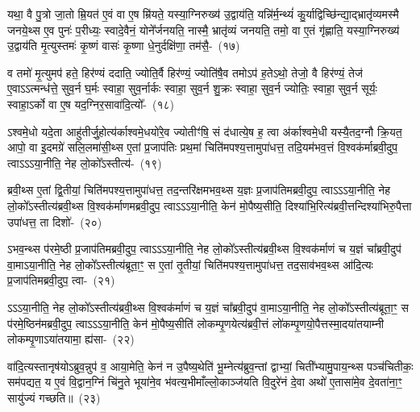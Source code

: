 {\anuvakamend[{भा॒ग॒धेय॒ञ्जुह्व॑ति पर॒मा रा॒ष्ट्रं द॑धाति स॒प्त च॑}]}

यथा॒ वै पु॒त्रो जा॒तो म्रि॒यत॑ ए॒वं वा ए॒ष म्रि॑यते॒ यस्या॒ग्निरुख्य॑ उ॒द्वाय॑ति॒ यन्नि॑र्म॒न्थ्यं॑ कु॒र्याद्विच्छि॑न्द्या॒द्भ्रातृ॑व्यमस्मै जनये॒थ्स ए॒व पुनः॑ प॒रीध्यः॒ स्वादे॒वैनं॒ योने᳚र्जनयति॒ नास्मै॒ भ्रातृ॑व्यं जनयति॒ तमो॒ वा ए॒तं गृ॑ह्णाति॒ यस्या॒ग्निरुख्य॑ उ॒द्वाय॑ति मृ॒त्युस्तमः॑ कृ॒ष्णं वासः॑ कृ॒ष्णा धे॒नुर्दक्षि॑णा॒ तम॑सै॒-~(१७)\ip

व तमो॑ मृ॒त्युमप॑ हते॒ हिर॑ण्यं ददाति॒ ज्योति॒र्वै हिर॑ण्यं॒ ज्योति॑षै॒व तमो\-ऽप॑ ह॒ते\-ऽथो॒ तेजो॒ वै हिर॑ण्यं॒ तेज॑ ए॒वा\-ऽऽ\-त्मन्ध॑त्ते॒ सुव॒र्न घ॒र्मः स्वाहा॒ सुव॒र्नार्कः स्वाहा॒ सुव॒र्न शु॒क्रः स्वाहा॒ सुव॒र्न ज्योतिः॒ स्वाहा॒ सुव॒र्न सूर्यः॒ स्वाहा॒\-ऽर्को वा ए॒ष यद॒ग्निर॒सावा॑दि॒त्यो᳚-~(१८)\ip

ऽश्वमे॒धो यदे॒ता आहु॑तीर्जु॒होत्य॑र्काश्वमे॒धयो॑रे॒व ज्योतीꣳ॑षि॒ सं द॑धात्ये॒ष ह॒ त्वा अ॑र्का\-श्वमे॒धी यस्यै॒तद॒ग्नौ क्रि॒यत॒ आपो॒ वा इ॒दमग्रे॑ सलि॒लमा॑सी॒थ्स ए॒तां प्र॒जा\-प॑तिः प्रथ॒मां चिति॑\-मपश्य॒त्तामुपा॑धत्त॒ तदि॒यम॑भव॒त्तं वि॒श्वक॑र्माब्रवी॒दुप॒ त्वा\-ऽऽ\-ऽया॒नीति॒ नेह लो॒को᳚\-ऽस्तीत्य॑-~(१९)\ip

ब्रवी॒थ्स ए॒तां द्वि॒तीयां॒ चिति॑मपश्य॒त्तामुपा॑धत्त॒ तद॒न्तरि॑क्षमभव॒थ्स य॒ज्ञः प्र॒जा\-प॑ति\-मब्रवी॒दुप॒ त्वा\-ऽऽ\-ऽया॒नीति॒ नेह लो॒को᳚\-ऽस्तीत्य॑ब्रवी॒थ्स वि॒श्वक॑र्माणमब्रवी॒दुप॒ त्वा\-ऽऽ\-ऽया॒नीति॒ केन॑ मो॒पैष्य॒सीति॒ दिश्या॑भि॒रित्य॑ब्रवी॒त्तन्दिश्या॑भिरु॒पैत्ता उपा॑धत्त॒ ता दिशो॑-~(२०)\ip

ऽभव॒न्थ्स प॑रमे॒ष्ठी प्र॒जा\-प॑ति\-मब्रवी॒दुप॒ त्वा\-ऽऽ\-ऽया॒नीति॒ नेह लो॒को᳚\-ऽस्तीत्य॑ब्रवी॒थ्स वि॒श्वक॑र्माणं च य॒ज्ञं चा᳚ब्रवी॒दुप॑ वा॒मा\-ऽया॒नीति॒ नेह लो॒को᳚\-ऽस्तीत्य॑ब्रूता॒ꣳ॒ स ए॒तां तृ॒तीयां॒ चिति॑मपश्य॒त्तामुपा॑धत्त॒ तद॒साव॑भव॒थ्स आ॑दि॒त्यः प्र॒जा\-प॑ति\-मब्रवी॒दुप॒ त्वा-~(२१)\ip

ऽऽ\-ऽया॒नीति॒ नेह लो॒को᳚\-ऽस्तीत्य॑ब्रवी॒थ्स वि॒श्वक॑र्माणं च य॒ज्ञं चा᳚ब्रवी॒दुप॑ वा॒मा\-ऽया॒नी\-ति॒ नेह लो॒को᳚\-ऽस्तीत्य॑ब्रूता॒ꣳ॒ स प॑रमे॒ष्ठिन॑मब्रवी॒दुप॒ त्वा\-ऽऽ\-ऽया॒नीति॒ केन॑ मो॒पैष्य॒सीति॑ लोकम्पृ॒णयेत्य॑ब्रवी॒त्तं लो॑कम्पृ॒णयो॒पैत्तस्मा॒दया॑तयाम्नी लोकम्पृ॒णा\-ऽया॑तयामा॒ ह्य॑सा-~(२२)\ip

वा॑दि॒त्यस्तानृष॑यो\-ऽब्रुव॒न्नुप॑ व॒ आया॒मेति॒ केन॑ न उ॒पैष्य॒थेति॑ भू॒म्नेत्य॑ब्रुव॒न्तां द्वाभ्यां॒ चिती᳚भ्यामु॒पाय॒न्थ्स पञ्च॑चितीकः॒ सम॑पद्यत॒ य ए॒वं वि॒द्वान॒ग्निं चि॑नु॒ते भूया॑ने॒व भ॑वत्य॒भीमाँल्लो॒काञ्ज॑यति वि॒दुरे॑नं दे॒वा अथो॑ ए॒तासा॑मे॒व दे॒वता॑ना॒ꣳ॒ सायु॑ज्यं गच्छति॥~(२३)\ip

{\anuvakamend[{तम॑सा\-ऽऽ\-दि॒त्यो᳚\-ऽस्तीति॒ दिश॑ आदि॒त्यः प्र॒जा\-प॑ति\-मब्रवी॒दुप॑ त्वा॒\-ऽसौ पञ्च॑चत्वारिꣳशच्च}]}

